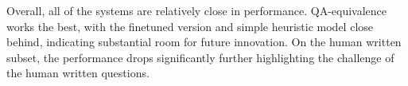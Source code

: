 Overall, all of the systems are relatively close in performance. QA-equivalence works the best, with the finetuned version and simple heuristic model close behind, indicating substantial room for future innovation. 
On the human written subset, the performance drops significantly further highlighting the challenge of the human written questions.  




